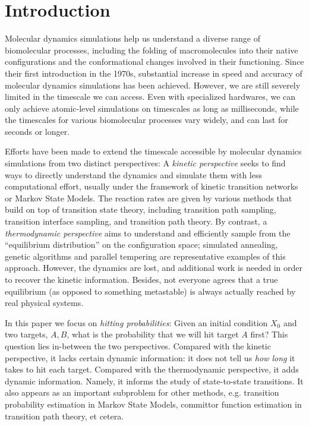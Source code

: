 \documentclass[nofootinbib,english, aip, jcp, priprint, graphicx,floatfix]{revtex4-1}
\theoremstyle{plain}
\theoremstyle{definition}
\theoremstyle{plain}
\begin{document}
\section{Introduction}
\label{sec:Introduction}

Molecular dynamics simulations help us understand a diverse range of biomolecular processes, including the folding of macromolecules into their native configurations\cite{Scheraga2007-qw} and the conformational changes involved in their functioning.\cite{Hospital2015-ol} Since their first introduction in the 1970s,\cite{McCammon1977-kg, Warshel1976-qg} substantial increase in speed and accuracy of molecular dynamics simulations has been achieved. However, we are still severely limited in the timescale we can access. Even with specialized hardwares, we can only achieve atomic-level simulations on timescales as long as milliseconds,\cite{Dror2012-ws} while the timescales for various biomolecular processes vary widely, and can last for seconds or longer.\cite{Naganathan2005-ki, Zemora2010-lb} 

Efforts have been made to extend the timescale accessible by molecular dynamics simulations from two distinct perspectives: A \emph{kinetic perspective} seeks to find ways to directly understand the dynamics and simulate them with less computational effort, usually under the framework of kinetic transition networks\cite{Noe2006-cs, Wales2006-ur} or Markov State Models\cite{Pande2010-yi, Chodera2014-bh, Husic2018-xp}. The reaction rates are given by various methods that build on top of transition state theory\cite{Eyring1935-ur, Chandler1978-bq, Wigner1997-kk}, including transition path sampling\cite{Dellago1998-lb, Bolhuis2002-ws}, transition interface sampling\cite{Van_Erp2005-vw}, and transition path theory\cite{E2006-fm, E2010-sr}. By contrast, a \emph{thermodynamic perspective} aims to understand and efficiently sample from the ``equilibrium distribution'' on the configuration space; simulated annealing,\cite{Kirkpatrick1983-su} genetic algorithms\cite{Goldberg1989-ko} and parallel tempering\cite{Sugita1999-vh} are representative examples of this approach. However, the dynamics are lost, and additional work\cite{Yang2007-gn, Andrec2005-fh, Zheng2009-ow, Huang2010-uu} is needed in order to recover the kinetic information. Besides, not everyone agrees that a true equilibrium (as opposed to something metastable) is always actually reached by real physical systems\cite{Levinthal1968-ov, Baker1994-px}.

In this paper we focus on \emph{hitting probabilities}: Given an initial condition $X_0$ and two targets, $A,B$, what is the probability that we will hit target $A$ first? This question lies in-between the two perspectives. Compared with the kinetic perspective, it lacks certain dynamic information: it does not tell us \emph{how long} it takes to hit each target.  Compared with the thermodynamic perspective, it adds dynamic information.
Namely, it informs the study of state-to-state transitions.  It also appears as an important subproblem for other methods, e.g. transition probability estimation in Markov State Models, committor function estimation in transition path theory, et cetera.
\end{document}
